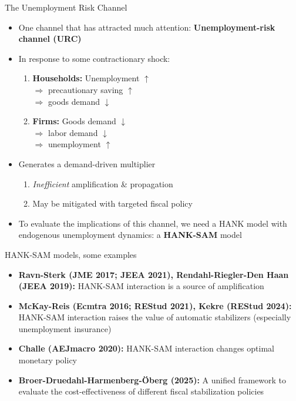 \documentclass[9pt]{beamer}
\begin{document}
\begin{frame}{The Unemployment Risk Channel}
\begin{itemize}
	\setlength\itemsep{1.5em}	
	
	\item One channel that has attracted much attention: \textbf{Unemployment-risk
		channel (URC)}
	
	\item In response to some contractionary shock:
	\begin{enumerate}
		\setlength\itemsep{0.5em}
		\item \textbf{Households:} Unemployment $\uparrow$ \\
		$\Rightarrow$ precautionary saving $\uparrow$ \\
		$\Rightarrow$ goods demand $\downarrow$
		\item \textbf{Firms:} Goods demand $\downarrow$ \\
		$\Rightarrow$ labor demand $\downarrow$ \\
		$\Rightarrow$ unemployment $\uparrow$
	\end{enumerate}
	\item Generates a demand-driven multiplier
	\begin{enumerate}
		\setlength\itemsep{0.5em}
		\item \emph{Inefficient }amplification \& propagation
		\item May be mitigated with targeted fiscal policy
	\end{enumerate}
	\item To evaluate the implications of this channel, we need a HANK model
	with endogenous unemployment dynamics: a \textbf{HANK-SAM} model
\end{itemize}
\end{frame}


\begin{frame}{HANK-SAM models, some examples}
\begin{itemize}
	\setlength\itemsep{1.5em}
		
	\item \textbf{Ravn-Sterk (JME 2017; JEEA 2021), Rendahl-Riegler-Den Haan
		(JEEA 2019): }HANK-SAM interaction is a source of amplification
	\item \textbf{McKay-Reis (Ecmtra 2016; REStud 2021), Kekre (REStud 2024):
	}HANK-SAM interaction raises the value of automatic stabilizers (especially
	unemployment insurance)
	\item \textbf{Challe (AEJmacro 2020):} HANK-SAM interaction changes optimal
	monetary policy
	\item \textbf{Broer-Druedahl-Harmenberg-{\"O}berg (2025):} A unified
	framework to evaluate the cost-effectiveness of different fiscal stabilization
	policies
\end{itemize}
\end{frame}
\end{document}
